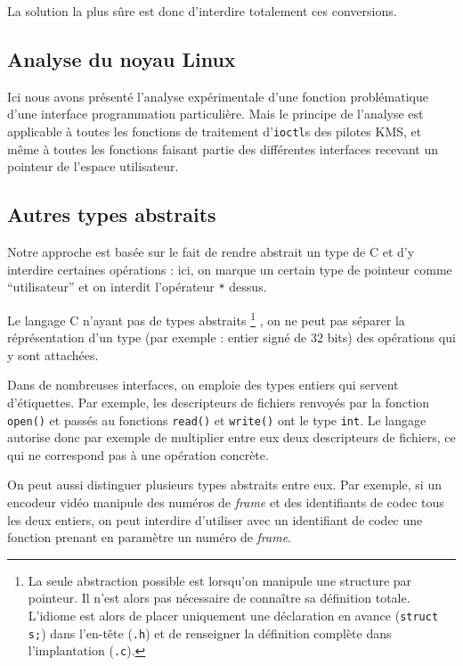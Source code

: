 
La solution la plus sûre est donc d'interdire totalement ces conversions.

\subsection{Analyse du noyau Linux}

Ici nous avons présenté l'analyse expérimentale d'une fonction problématique
d'une interface programmation particulière. Mais le principe de l'analyse est
applicable à toutes les fonctions de traitement d'\texttt{ioctl}s des pilotes
KMS, et même à toutes les fonctions faisant partie des différentes interfaces
recevant un pointeur de l'espace utilisateur.

\subsection{Autres types abstraits}

Notre approche est basée sur le fait de rendre abstrait un type de C et
d'y interdire certaines opérations : ici, on marque un certain type de pointeur
comme ``utilisateur'' et on interdit l'opérateur \texttt{*} dessus.

Le langage C n'ayant pas de types abstraits
\footnote{
  La seule abstraction possible est lorsqu'on manipule une structure par
  pointeur. Il n'est alors pas nécessaire de connaître sa définition totale.
  L'idiome est alors de placer uniquement une déclaration en avance
  (\texttt{struct s;}) dans l'en-tête (\texttt{.h}) et de renseigner
  la définition complète dans l'implantation (\texttt{.c}).
}
, on ne peut pas séparer la réprésentation d'un type (par exemple : entier signé
de 32 bits) des opérations qui y sont attachées.

Dans de nombreuses interfaces, on emploie des types entiers qui servent
d'étiquettes. Par exemple, les descripteurs de fichiers renvoyés par la fonction
\texttt{open()} et passés au fonctions \texttt{read()} et \texttt{write()} ont
le type \texttt{int}. Le langage autorise donc par exemple de multiplier entre
eux deux descripteurs de fichiers, ce qui ne correspond pas à une opération
concrète.

On peut aussi distinguer plusieurs types abstraits entre eux. Par exemple, si un
encodeur vidéo manipule des numéros de \emph{frame} et des identifiants de codec
tous les deux entiers, on peut interdire d'utiliser avec un identifiant de codec
une fonction prenant en paramètre un numéro de \emph{frame}.

